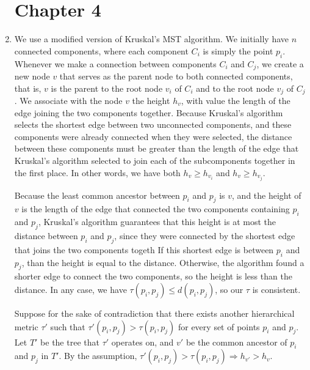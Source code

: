 \documentclass[oneside, 12pt]{article}
\begin{document}
\begin{enumerate}
\section*{Chapter 4}
\setcounter{enumi}{24}
\item
We use a modified version of Kruskal's MST algorithm. We initially have $n$ connected components, where each component $C_i$ is simply the point $p_i$. Whenever we make a connection between components $C_i$ and $C_j$, we create a new node $v$ that serves as the parent node to both connected components, that is, $v$ is the parent to the root node $v_i$ of $C_i$ and to the root node $v_j$ of $C_j$. We associate with the node $v$ the height $h_v$, with value the length of the edge joining the two components together. Because Kruskal's algorithm selects the shortest edge between two unconnected components, and these components were already connected when they were selected, the distance between these components must be greater than the length of the edge that Kruskal's algorithm selected to join each of the subcomponents together in the first place. In other words, we have both $h_v \ge h_{v_i}$ and $h_v \ge h_{v_j}$.

Because the least common ancestor between $p_i$ and $p_j$ is $v$, and the height of $v$ is the length of the edge that connected the two components containing $p_i$ and $p_j$, Kruskal's algorithm guarantees that this height is at most the distance between $p_i$ and $p_j$, since they were connected by the shortest edge that joins the two components togeth If this shortest edge is between $p_i$ and $p_j$, than the height is equal to the distance. Otherwise, the algorithm found a shorter edge to connect the two components, so the height is less than the distance. In any case, we have $\tau(p_i, p_j) \le d(p_i, p_j)$, so our $\tau$ is consistent.

Suppose for the sake of contradiction that there exists another hierarchical metric $\tau'$ such that $\tau'(p_i, p_j) > \tau(p_i, p_j)$ for every set of points $p_i$ and $p_j$. Let $T'$ be the tree that $\tau'$ operates on, and $v'$ be the common ancestor of $p_i$ and $p_j$ in $T'$. By the assumption, $\tau'(p_i, p_j) > \tau(p_i, p_j) \Rightarrow h_{v'} > h_v$. 


\end{enumerate}
\end{document}
